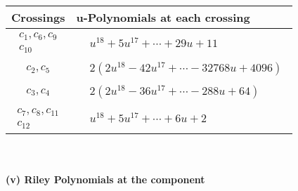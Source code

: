 \documentclass[1p]{elsarticle_modified}
\theoremstyle{definition}
\begin{document}
\begin{tabular}{m{50pt}|m{274pt}}
Crossings & \hspace{64pt}u-Polynomials at each crossing \\
\hline $$\begin{aligned}c_{1},c_{6},c_{9}\\c_{10}\end{aligned}$$&$\begin{aligned}
&u^{18}+5 u^{17}+\cdots+29 u+11
\end{aligned}$\\
\hline $$\begin{aligned}c_{2},c_{5}\end{aligned}$$&$\begin{aligned}
&2(2 u^{18}-42 u^{17}+\cdots-32768 u+4096)
\end{aligned}$\\
\hline $$\begin{aligned}c_{3},c_{4}\end{aligned}$$&$\begin{aligned}
&2(2 u^{18}-36 u^{17}+\cdots-288 u+64)
\end{aligned}$\\
\hline $$\begin{aligned}c_{7},c_{8},c_{11}\\c_{12}\end{aligned}$$&$\begin{aligned}
&u^{18}+5 u^{17}+\cdots+6 u+2
\end{aligned}$\\
\hline
\end{tabular}\\~\\
\newpage\renewcommand{\arraystretch}{1}
\flushleft \textbf{(v) Riley Polynomials at the component}\newline \\
\end{document}
